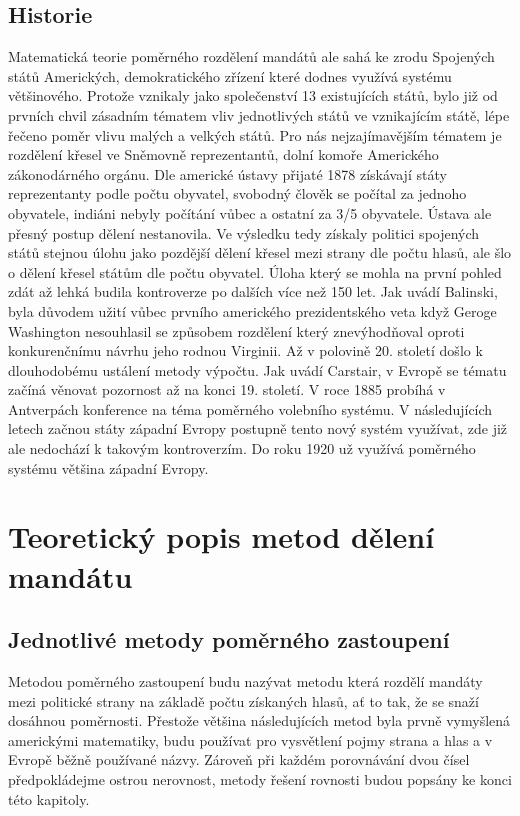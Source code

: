 \documentclass[12pt]{report}
\begin{document}
\section{Historie} Matematická teorie poměrného rozdělení mandátů ale sahá ke zrodu Spojených států Amerických, demokratického zřízení které dodnes využívá systému většinového.\autocite{BAL2} Protože vznikaly jako společenství 13 existujících států, bylo již od prvních chvil zásadním tématem vliv jednotlivých států ve vznikajícím státě, lépe řečeno poměr vlivu malých a velkých států.
Pro nás nejzajímavějším tématem je rozdělení křesel ve Sněmovně reprezentantů, dolní komoře Amerického zákonodárného orgánu.
Dle americké ústavy přijaté 1878 získávají státy reprezentanty podle počtu obyvatel, svobodný člověk se počítal za jednoho obyvatele, indiáni nebyly počítání vůbec a ostatní za 3/5 obyvatele.\autocite{CON} Ústava ale přesný postup dělení nestanovila.
Ve výsledku tedy získaly politici spojených států stejnou úlohu jako pozdější dělení křesel mezi strany dle počtu hlasů, ale šlo o dělení křesel státům dle počtu obyvatel.
Úloha který se mohla na první pohled zdát až lehká budila kontroverze po dalších více než 150 let.
Jak uvádí Balinski, byla důvodem užití vůbec prvního amerického prezidentského veta když Geroge Washington nesouhlasil se způsobem rozdělení který znevýhodňoval oproti konkurenčnímu návrhu jeho rodnou Virginii.\autocite{BAL1}
Až v polovině 20.
století došlo k dlouhodobému ustálení metody výpočtu.
Jak uvádí Carstair, v Evropě se tématu začíná věnovat pozornost až na konci 19.
století.
V roce 1885 probíhá v Antverpách konference na téma poměrného volebního systému.
V následujících letech začnou státy západní Evropy postupně tento nový systém využívat, zde již ale nedochází k takovým kontroverzím.
Do roku 1920 už využívá poměrného systému většina západní Evropy.\autocite{BOO} 
\chapter{Teoretický popis metod dělení mandátu}
\section{Jednotlivé metody poměrného zastoupení} Metodou poměrného zastoupení budu nazývat metodu která rozdělí mandáty mezi politické strany na základě počtu získaných hlasů, ať to tak, že se snaží dosáhnou poměrnosti.
Přestože většina následujících metod byla prvně vymyšlená americkými matematiky, budu používat pro vysvětlení pojmy strana a hlas a v Evropě běžně používané názvy.
Zároveň při každém porovnávání dvou čísel předpokládejme ostrou nerovnost, metody řešení rovnosti budou popsány ke konci této kapitoly.
\end{document}
